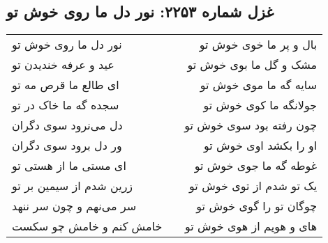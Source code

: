 \begin{center}
\section*{غزل شماره ۲۲۵۳: نور دل ما روی خوش تو}
\label{sec:2253}
\begin{longtable}{l p{0.5cm} r}
نور دل ما روی خوش تو
&&
بال و پر ما خوی خوش تو
\\
عید و عرفه خندیدن تو
&&
مشک و گل ما بوی خوش تو
\\
ای طالع ما قرص مه تو
&&
سایه گه ما موی خوش تو
\\
سجده گه ما خاک در تو
&&
جولانگه ما کوی خوش تو
\\
دل می‌نرود سوی دگران
&&
چون رفته بود سوی خوش تو
\\
ور دل برود سوی دگران
&&
او را بکشد اوی خوش تو
\\
ای مستی ما از هستی تو
&&
غوطه گه ما جوی خوش تو
\\
زرین شدم از سیمین بر تو
&&
یک تو شدم از توی خوش تو
\\
سر می‌نهم و چون سر ننهد
&&
چوگان تو را گوی خوش تو
\\
خامش کنم و خامش چو سکست
&&
های و هویم از هوی خوش تو
\\
\end{longtable}
\end{center}
